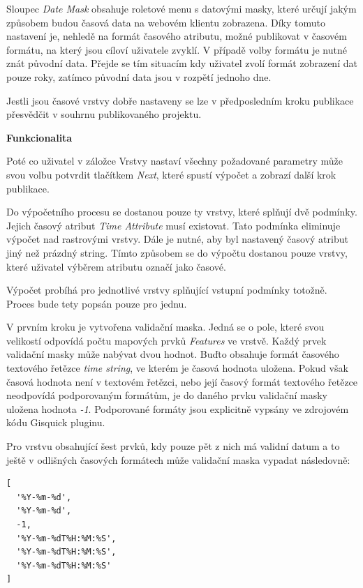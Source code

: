 Sloupec \textit{Date Mask} obsahuje roletové menu s datovými masky, které určují jakým způsobem budou časová data na webovém klientu zobrazena. Díky tomuto nastavení je, nehledě na formát časového atributu, možné publikovat v časovém formátu, na který jsou cíloví uživatele zvyklí. V případě volby formátu je nutné znát původní data. Přejde se tím situacím kdy uživatel zvolí formát zobrazení dat pouze roky, zatímco původní data jsou v rozpětí jednoho dne.

Jestli jsou časové vrstvy dobře nastaveny se lze v předposledním kroku publikace přesvědčit v souhrnu publikovaného projektu.

\bigskip
\noindent
\textbf{Funkcionalita}

Poté co uživatel v záložce Vrstvy nastaví všechny požadované parametry může svou volbu potvrdit tlačítkem \textit{Next}, které spustí výpočet a zobrazí další krok publikace.

Do výpočetního procesu se dostanou pouze ty vrstvy, které splňují dvě podmínky. Jejich časový atribut \textit{Time Attribute} musí existovat. Tato podmínka eliminuje výpočet nad rastrovými vrstvy. Dále je nutné, aby byl nastavený časový atribut jiný než prázdný string. Tímto způsobem se do výpočtu dostanou pouze vrstvy, které uživatel výběrem atributu označí jako časové.

Výpočet probíhá pro jednotlivé vrstvy splňující vstupní podmínky totožně. Proces bude tety popsán pouze pro jednu.

V prvním kroku je vytvořena validační maska. Jedná se o pole, které svou velikostí odpovídá počtu mapových prvků \textit{Features} ve vrstvě. Každý prvek validační masky může nabývat dvou hodnot. Buďto obsahuje formát časového textového řetězce \textit{time string}, ve kterém je časová hodnota uložena. Pokud však časová hodnota není v textovém řetězci, nebo její časový formát textového řetězce neodpovídá podporovaným formátům, je do daného prvku validační masky uložena hodnota \textit{-1}. Podporované formáty jsou explicitně vypsány ve zdrojovém kódu Gisquick pluginu.

Pro vrstvu obsahující šest prvků, kdy pouze pět z nich má validní datum a to ještě v odlišných časových formátech může validační maska vypadat následovně:

\begin{verbatim}
[
  '%Y-%m-%d',
  '%Y-%m-%d',
  -1,
  '%Y-%m-%dT%H:%M:%S',
  '%Y-%m-%dT%H:%M:%S',
  '%Y-%m-%dT%H:%M:%S'
]
\end{verbatim}

